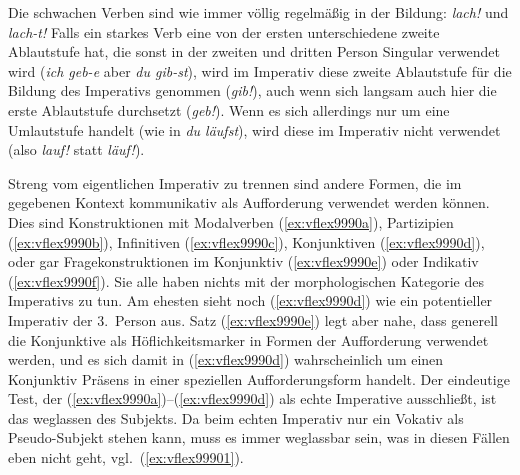 Die schwachen Verben sind wie immer völlig regelmäßig in der Bildung: \textit{lach!} und \textit{lach-t!}
Falls ein starkes Verb eine von der ersten unterschiedene zweite Ablautstufe hat, die sonst in der zweiten und dritten Person Singular verwendet wird (\textit{ich geb-e} aber \textit{du gib-st}), wird im Imperativ diese zweite Ablautstufe für die Bildung des Imperativs genommen (\textit{gib!}), auch wenn sich langsam auch hier die erste Ablautstufe durchsetzt (\textit{geb!}).
Wenn es sich allerdings nur um eine Umlautstufe handelt (wie in \textit{du läufst}), wird diese im Imperativ nicht verwendet (also \textit{lauf!} statt \textit{\Ast läuf!}).

Streng vom eigentlichen Imperativ zu trennen sind andere Formen, die im gegebenen Kontext kommunikativ als Aufforderung verwendet werden können.
Dies sind \zB Konstruktionen mit Modalverben (\ref{ex:vflex9990a}), Partizipien (\ref{ex:vflex9990b}), Infinitiven (\ref{ex:vflex9990c}), Konjunktiven (\ref{ex:vflex9990d}), oder gar Fragekonstruktionen im Konjunktiv (\ref{ex:vflex9990e}) oder Indikativ (\ref{ex:vflex9990f}).
Sie alle haben nichts mit der morphologischen Kategorie des Imperativs zu tun.
Am ehesten sieht noch (\ref{ex:vflex9990d}) wie ein potentieller Imperativ der 3.~Person aus.
Satz (\ref{ex:vflex9990e}) legt aber nahe, dass generell die Konjunktive als Höflichkeitsmarker in Formen der Aufforderung verwendet werden, und es sich damit in (\ref{ex:vflex9990d}) wahrscheinlich um einen Konjunktiv Präsens in einer speziellen Aufforderungsform handelt.
Der eindeutige Test, der (\ref{ex:vflex9990a})--(\ref{ex:vflex9990d}) als echte Imperative ausschließt, ist das weglassen des Subjekts.
Da beim echten Imperativ nur ein Vokativ als Pseudo-Subjekt stehen kann, muss es immer weglassbar sein, was in diesen Fällen eben nicht geht, vgl.\ (\ref{ex:vflex99901}). 

\begin{exe}
  \ex\label{ex:vflex9990}
    \begin{xlist}
    \end{xlist}
  \ex\label{ex:vflex99901}
    \begin{xlist}
    \end{xlist}
\end{exe}

